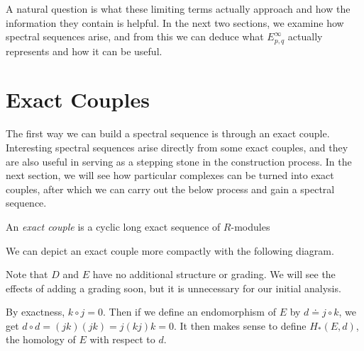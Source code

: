 \documentclass[twoside,10pt]{article}
\begin{document}
A natural question is what these limiting terms actually approach and how the information they contain is helpful. In the next two sections, we examine how spectral sequences arise, and from this we can deduce what $E_{p,q}^{\infty}$ actually represents and how it can be useful.


\section{Exact Couples}

The first way we can build a spectral sequence is through an exact couple. Interesting spectral sequences arise directly from some exact couples, and they are also useful in serving as a stepping stone in the construction process. In the next section, we will see how particular complexes can be turned into exact couples, after which we can carry out the below process and gain a spectral sequence.

\begin{defn}[]
	An \textit{exact couple} is a cyclic long exact sequence of $R$-modules
	\begin{center}
	\end{center}
\end{defn}
We can depict an exact couple more compactly with the following diagram.
\begin{center}
\end{center}
Note that $D$ and $E$ have no additional structure or grading. We will see the effects of adding a grading soon, but it is unnecessary for our initial analysis.

By exactness, $k \circ j = 0$. Then if we define an endomorphism of $E$ by $d \doteq j\circ k$, we get $d \circ d = (jk)(jk) = j(kj)k = 0$. It then makes sense to define $H_*(E,d)$, the homology of $E$ with respect to $d$.
\end{document}
